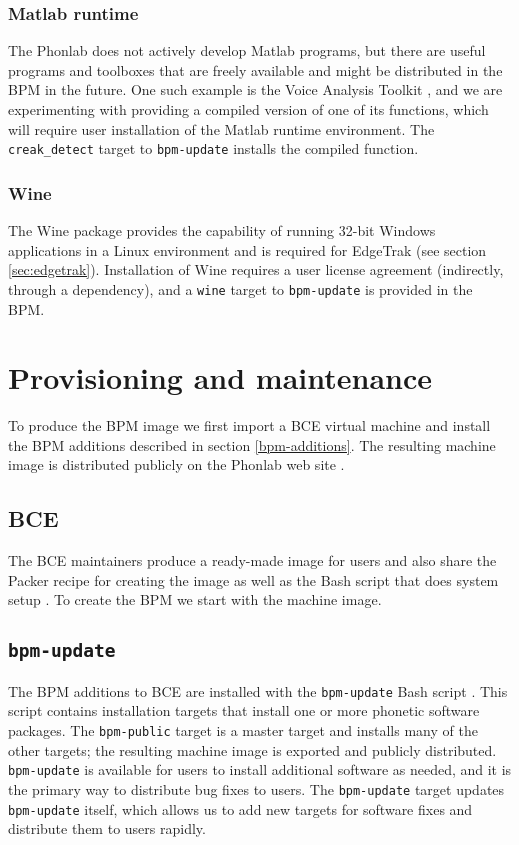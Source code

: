 \documentclass[a4paper]{article}
\begin{document}
      \subsubsection{Matlab runtime}
      The Phonlab does not actively develop Matlab programs, but there are useful programs and toolboxes that are freely available and might be distributed in the BPM in the future. One such example is the Voice Analysis Toolkit \cite{voice-analysis-toolkit}, and we are experimenting with providing a compiled version of one of its functions, which will require user installation of the Matlab runtime environment. The {\tt creak\_detect} target to {\tt bpm-update} installs the compiled function.

      \subsubsection{Wine}
      The Wine package provides the capability of running 32-bit Windows applications in a Linux environment and is required for EdgeTrak (see section \ref{sec:edgetrak}). Installation of Wine requires a user license agreement (indirectly, through a dependency), and a {\tt wine} target to {\tt bpm-update} is provided in the BPM.

  \section{Provisioning and maintenance}
  To produce the BPM image we first import a BCE virtual machine and install the BPM additions described in section \ref{bpm-additions}. The resulting machine image is distributed publicly on the Phonlab web site \cite{bpm-wiki}.

      \subsection{BCE}
      The BCE maintainers produce a ready-made image for users and also share the Packer \cite{packer} recipe for creating the image as well as the Bash script that does system setup \cite{bce-git}. To create the BPM we start with the machine image.

      \subsection{{\tt bpm-update}}\label{bpm-update}
      The BPM additions to BCE are installed with the {\tt bpm-update} Bash script \cite{bpm-update-git}. This script contains installation targets that install one or more phonetic software packages. The {\tt bpm-public} target is a master target and installs many of the other targets; the resulting machine image is exported and publicly distributed. {\tt bpm-update} is available for users to install additional software as needed, and it is the primary way to distribute bug fixes to users. The {\tt bpm-update} target updates {\tt bpm-update} itself, which allows us to add new targets for software fixes and distribute them to users rapidly.
\end{document}
